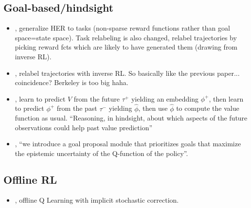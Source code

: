 \subsection{Goal-based/hindsight}

\begin{itemize}
\item \citet{li2020generalized}, generalize HER to tasks (non-sparse reward functions rather than goal space=state space). Task relabeling is also changed, relabel trajectories by picking reward fcts which are likely to have generated them (drawing from inverse RL).
\item \citet{eysenbach2020rewriting}, relabel trajectories with inverse RL. So basically like the previous paper... coincidence? Berkeley is too big haha.
\item \citet{guez2020value}, learn to predict $V$ from the future $\tau^+$ yielding an embedding $\phi^+$, then learn to predict $\phi^+$ from the past $\tau^-$ yielding $\hat\phi$, then use $\hat\phi$ to compute the value function as usual. ``Reasoning, in hindsight, about which aspects of the future observations could help past value prediction''
  \item \citet{zhang2020automatic}, ``we introduce a goal proposal module that prioritizes goals that maximize the epistemic uncertainty of the Q-function of the policy''.
\end{itemize}

\subsection{Offline RL}
\begin{itemize}
\item \citet{kostrikov2022offline}, offline Q Learning with implicit stochastic correction.
\end{itemize}


